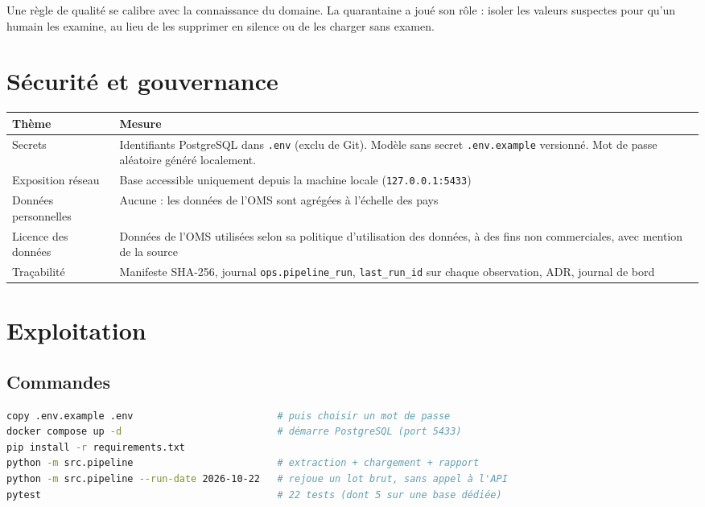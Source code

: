\documentclass[11pt, a4paper, oneside, headings=normal, numbers=noenddot, DIV=12]{scrartcl}
\begin{document}
\begin{keybox}[Leçon]
Une règle de qualité se calibre avec la connaissance du domaine. La quarantaine a joué son rôle : isoler les valeurs suspectes pour
qu'un humain les examine, au lieu de les supprimer en silence ou de les charger sans examen.
\end{keybox}

\section{Sécurité et gouvernance}

\begin{tabularx}{\linewidth}{@{}L{3.6cm} Y@{}}
\toprule
\textbf{Thème} & \textbf{Mesure} \\
\midrule
Secrets & Identifiants PostgreSQL dans \texttt{.env} (exclu de Git). Modèle sans secret \texttt{.env.example} versionné. Mot de passe aléatoire généré localement. \\
Exposition réseau & Base accessible uniquement depuis la machine locale (\texttt{127.0.0.1:5433}) \\
Données personnelles & Aucune : les données de l'OMS sont agrégées à l'échelle des pays \\
Licence des données & Données de l'OMS utilisées selon sa politique d'utilisation des données, à des fins non commerciales, avec mention de la source \\
Traçabilité & Manifeste SHA-256, journal \texttt{ops.pipeline\_run}, \texttt{last\_run\_id} sur chaque observation, ADR, journal de bord \\
\bottomrule
\end{tabularx}

\section{Exploitation}

\subsection{Commandes}
\begin{lstlisting}[language=bash]
copy .env.example .env                         # puis choisir un mot de passe
docker compose up -d                           # démarre PostgreSQL (port 5433)
pip install -r requirements.txt
python -m src.pipeline                         # extraction + chargement + rapport
python -m src.pipeline --run-date 2026-10-22   # rejoue un lot brut, sans appel à l'API
pytest                                         # 22 tests (dont 5 sur une base dédiée)
\end{lstlisting}
\end{document}
